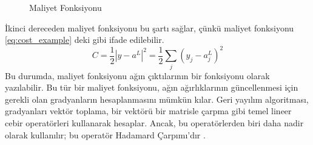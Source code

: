 \begin{figure}[H]
    \caption{Maliyet Fonksiyonu}
    \label{fig:DNN_Cost}
\end{figure}

İkinci dereceden maliyet fonksiyonu bu şartı sağlar, çünkü maliyet fonksiyonu \eqref{eq:cost_example} deki gibi ifade edilebilir. \begin{equation} C = \frac{1}{2} |y-a^L|^2 = \frac{1}{2} \sum_j (y_j-a^L_j)^2 \label{eq:cost_example} \end{equation} Bu durumda, maliyet fonksiyonu ağın çıktılarının bir fonksiyonu olarak yazılabilir. Bu tür bir maliyet fonksiyonu, ağın ağırlıklarının güncellenmesi için gerekli olan gradyanların hesaplanmasını mümkün kılar. Geri yayılım algoritması, gradyanları vektör toplama, bir vektörü bir matrisle çarpma gibi temel lineer cebir operatörleri kullanarak hesaplar. Ancak, bu operatörlerden biri daha nadir olarak kullanılır; bu operatör Hadamard Çarpımı'dır \cite{nielsen2015neural}.

